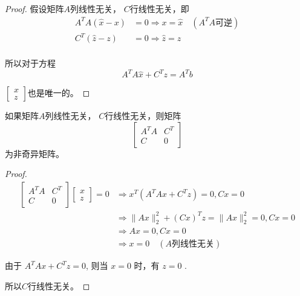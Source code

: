 \begin{proof}
    假设矩阵$A$列线性无关， $C$行线性无关，即
    \begin{equation}
    \begin{aligned}
    A^{T} A(\hat{x}-x) &=0 \Rightarrow x=\hat{x} \quad (A^TA 可逆) \\
    C^{T}(\hat{z}-z) &=0 \Rightarrow \hat{z}=z \\
    \end{aligned}
    \end{equation}

    所以对于方程
    \begin{equation}A^{T} A \hat{x}+C^{T} z =A^{T} b\end{equation}

    $\left[\begin{array}{l}x \\ z\end{array}\right]$也是唯一的。
\end{proof}
        
\begin{theorem}
    如果矩阵$A$列线性无关， $C$行线性无关，则矩阵
\begin{equation}
\left[\begin{array}{cc}
A^{T} A & C^{T} \\
{C} & 0
\end{array}\right]
\end{equation}
为非奇异矩阵。  
\end{theorem}

\begin{proof}
    \begin{equation} \begin{aligned}\left[\begin{array}{cc}A^{T} A & C^{T} \\ {C} & 0\end{array}\right]\left[\begin{array}{c}x \\ z\end{array}\right]=0 & \Rightarrow x^{T}\left(A^{T} A x+C^{T} z\right)=0, C x=0 \\ & \Rightarrow\|A x\|_{2}^{2}+(C x)^{T} z=\|A x\|_{2}^{2}=0, C x=0 \\ & \Rightarrow A x=0, C x=0 \\ & \Rightarrow x=0 \quad (A\text {列线性无关}) \end{aligned} \end{equation}

    由于 $ A^{T} A x+C^{T} {z}=0 $, 则当 $ x=0 $ 时，有 $ {z}=0 $ . 
    
    所以$C$行线性无关。
\end{proof}

